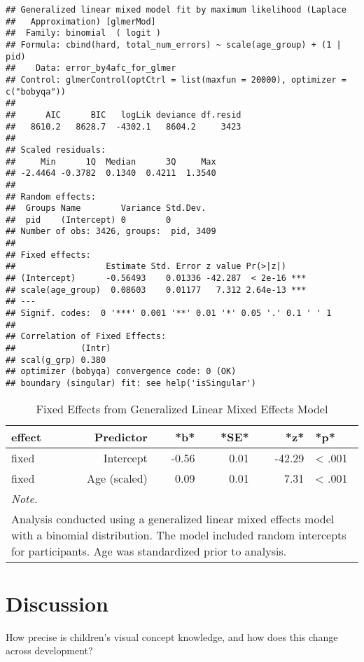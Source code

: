 \documentclass[
  man]{apa6}
\begin{document}
\begin{verbatim}
## Generalized linear mixed model fit by maximum likelihood (Laplace
##   Approximation) [glmerMod]
##  Family: binomial  ( logit )
## Formula: cbind(hard, total_num_errors) ~ scale(age_group) + (1 | pid)
##    Data: error_by4afc_for_glmer
## Control: glmerControl(optCtrl = list(maxfun = 20000), optimizer = c("bobyqa"))
## 
##      AIC      BIC   logLik deviance df.resid 
##   8610.2   8628.7  -4302.1   8604.2     3423 
## 
## Scaled residuals: 
##     Min      1Q  Median      3Q     Max 
## -2.4464 -0.3782  0.1340  0.4211  1.3540 
## 
## Random effects:
##  Groups Name        Variance Std.Dev.
##  pid    (Intercept) 0        0       
## Number of obs: 3426, groups:  pid, 3409
## 
## Fixed effects:
##                  Estimate Std. Error z value Pr(>|z|)    
## (Intercept)      -0.56493    0.01336 -42.287  < 2e-16 ***
## scale(age_group)  0.08603    0.01177   7.312 2.64e-13 ***
## ---
## Signif. codes:  0 '***' 0.001 '**' 0.01 '*' 0.05 '.' 0.1 ' ' 1
## 
## Correlation of Fixed Effects:
##             (Intr)
## scal(g_grp) 0.380 
## optimizer (bobyqa) convergence code: 0 (OK)
## boundary (singular) fit: see help('isSingular')
\end{verbatim}

\begin{longtable}[t]{lrrrrl}
\caption{\label{tab:unnamed-chunk-21}\label{tab:unnamed-chunk-21}Fixed Effects from Generalized Linear Mixed Effects Model}\\
\toprule
effect & Predictor & *b* & *SE* & *z* & *p*\\
\midrule
fixed & Intercept & -0.56 & 0.01 & -42.29 & < .001\\
fixed & Age (scaled) & 0.09 & 0.01 & 7.31 & < .001\\
\bottomrule
\multicolumn{6}{l}{\rule{0pt}{1em}\textit{Note.}}\\
\multicolumn{6}{l}{\rule{0pt}{1em}Analysis conducted using a generalized linear mixed effects model with a binomial distribution. The model included random intercepts for participants. Age was standardized prior to analysis.}\\
\end{longtable}

\section{Discussion}\label{discussion}

How precise is children's visual concept knowledge, and how does this change across development?
\end{document}
